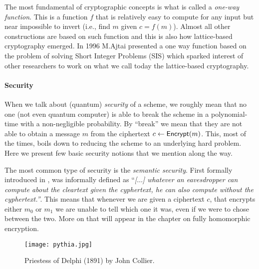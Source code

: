 The most fundamental of cryptographic concepts is what is called a \textit{one-way function}. This is a function $f$ that is relatively easy to compute for any input but near impossible to invert (i.e., find $m$ given $c = f(m)$). Almost all other constructions are based on such function and this is also how lattice-based cryptography emerged. In 1996 M.Ajtai presented \cite{ajtai} a one way function based on the problem of solving Short Integer Problems (SIS) which sparked interest of other researchers to work on what we call today the lattice-based cryptography.

\paragraph{Security}
When we talk about (quantum) \textit{security} of a scheme, we roughly mean that no one (not even quantum computer) is able to break the scheme in a polynomial-time with a non-negligible probability. By ``break'' we mean that they are not able to obtain a message $m$ from the ciphertext $c \leftarrow \textsf{Encrypt}(m)$. This, most of the times, boils down to reducing the scheme to an underlying hard problem. Here we present few basic security notions that we mention along the way.

The most common type of security is the \textit{semantic security}. First formally introduced in \cite{prob-cryp}, was informally defined as ``\textit{[$\ldots$] whatever an eavesdropper can compute about the cleartext given the cyphertext, he can also compute without the cyphertext.''}. This means that whenever we are given a ciphertext $c$, that encrypts either $m_0$ or $m_1$ we are unable to tell which one it was, even if we were to chose between the two. More on that will appear in the chapter on fully homomorphic encryption.

\begin{figure}[hb]
	\centering
	\texttt{[image: pythia.jpg]}
	\caption{Priestess of Delphi (1891) by John Collier.}
\end{figure}
